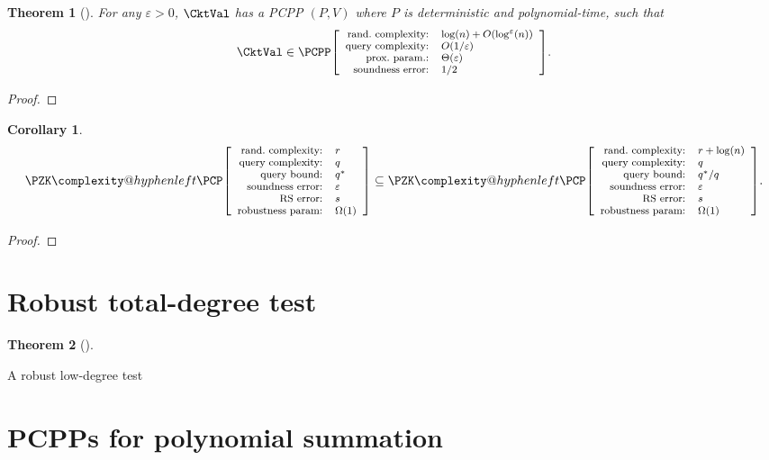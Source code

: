 \documentclass[english,12pt]{reedthesis}
\makeatletter
\theoremstyle{plain}
\newtheorem{thm}{Theorem}[section]
\newtheorem{cor}[cor]{Corollary}
\theoremstyle{definition}
\theoremstyle{remark}
\newcommand{\pcpp}[4]{%
  \ensuremath%
  \mleft[{\footnotesize\begin{array}{r l}
    \text{rand.\ complexity:} & #1 \\
    \text{query complexity:} & #2 \\
    \text{prox.\ param.:} & #3 \\
    \text{soundness error:} & #4
  \end{array}}\mright]%
}
\newcommand{\pzkpcpr}[6]{%
  \ensuremath%
  \mleft[{\footnotesize\begin{array}{r l}
    \text{rand.\ complexity:} & #1 \\
    \text{query complexity:} & #2 \\
    \text{query bound:} & #3 \\
    \text{soundness error:} & #4 \\
    \text{RS error:} & #5 \\
    \text{robustness param:} & #6
  \end{array}}\mright]%
}
\newcommand{\PZKPCP}{%
  \PZK\complexity@hyphenleft\PCP
}
\makeatother
\begin{document}
\begin{thm}[{\cite[Theorem 3.2]{BGHSV06}}]\label{thm:ckt-val-pcpp}
  For any $\varepsilon > 0$, $\CktVal$ has a PCPP $(P, V)$ where $P$ is deterministic and
  polynomial-time, such that
  \[
    \CktVal \in \PCPP\pcpp{\log(n) + O(\log^{\varepsilon}(n))}{O(1/\varepsilon)}{\Theta(\varepsilon)}{1/2}.
  \]
\end{thm}

\begin{proof}
\end{proof}

\begin{cor}\label{cor:constant-query}
  \begin{equation}\label{eqn:constant-query}
    \PZKPCP\pzkpcpr{r}{q}{q^{*}}{\varepsilon}{s}{\Omega(1)} \subseteq
    \PZKPCP\pzkpcpr{r + \log(n)}{q}{q^{*}/q}{\varepsilon}{s}{\Omega(1)}.
  \end{equation}
\end{cor}

\begin{proof}
\end{proof}

\section{Robust total-degree test}\label{sec:robust-degree}

\begin{thm}[{\cite[Prop.\ 5.7]{Par21}}]\label{thm:robust-low-deg}
\end{thm}

\begin{algorithm}[htbp]
  \caption{A robust low-degree test~\cite[Prop.\ 5.7]{Par21}}\label{alg:robust-low-deg}
\end{algorithm}

\section{PCPPs for polynomial summation}\label{sec:pcpp-poly-sum}
\end{document}
